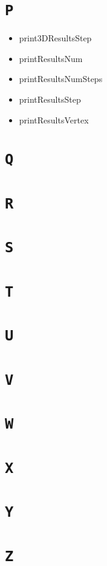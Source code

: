 \documentclass[10pt]{article}%
\begin{document}
\section*{\texttt{P}}

\begin{itemize}\item  print3DResultsStep
\item  printResultsNum
\item  printResultsNumSteps 
\item  printResultsStep
\item  printResultsVertex
\end{itemize}

\section*{\texttt{Q}}


\section*{\texttt{R}}


\section*{\texttt{S}}


\section*{\texttt{T}}


\section*{\texttt{U}}


\section*{\texttt{V}}


\section*{\texttt{W}}


\section*{\texttt{X}}


\section*{\texttt{Y}}


\section*{\texttt{Z}}

    

%
\end{document}
